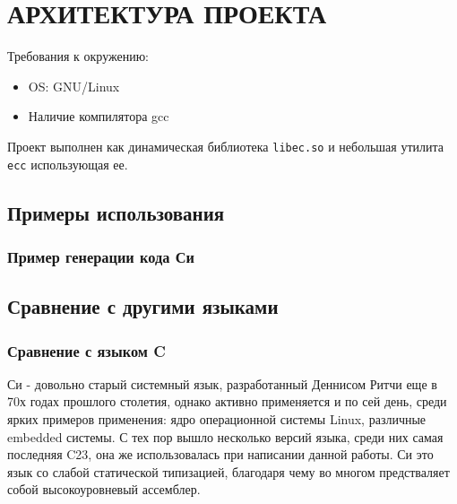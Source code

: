 \chapter{АРХИТЕКТУРА ПРОЕКТА}
\label{ch:ch1}


Требования к окружению:
\begin{itemize}
\item OS: GNU/Linux
\item Наличие компилятора gcc
\end{itemize}

\vspace{5pt}
Проект выполнен как динамическая библиотека \verb|libec.so| и небольшая утилита \verb|ecc| использующая ее.



\section{Примеры использования}
\subsection{Пример генерации кода Си}




\section{Сравнение с другими языками}
\subsection{Сравнение с языком C}
\label{langcmp:c}
Си - довольно старый системный язык, разработанный Деннисом Ритчи еще в 70х годах прошлого столетия, однако активно применяется и по сей день, среди ярких примеров применения: ядро операционной системы Linux, различные embedded системы.
С тех пор вышло несколько версий языка, среди них самая последняя C23, она же использовалась при написании данной работы.
Си это язык со слабой статической типизацией, благодаря чему во многом предстваляет собой высокоуровневый ассемблер.

